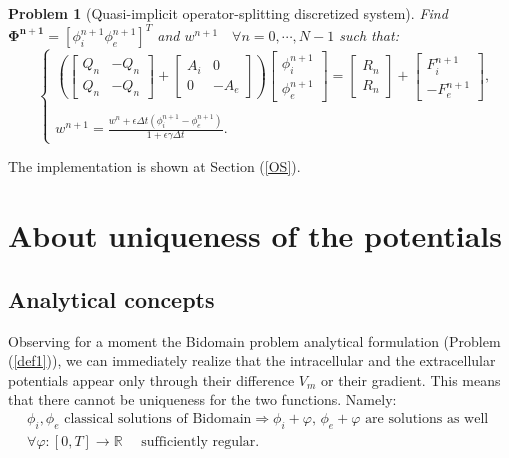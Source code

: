 \documentclass[a4paper,11pt]{article}
\newtheorem{problem}{Problem}
\begin{document}
\begin{problem} [Quasi-implicit operator-splitting discretized system]
Find $\bm{\Phi^{n+1}}=[\phi_i^{n+1} \phi_e^{n+1}]^T$ and $w^{n+1} \quad \forall n=0, \cdots, N-1$ such that:
\begin{equation*}
\quad
\begin{cases}
\left(
\begin{bmatrix} Q_n & -Q_n \\ Q_n & -Q_n \end{bmatrix} + 
\begin{bmatrix} A_i & 0 \\ 0 & -A_e\end{bmatrix}
\right)
\begin{bmatrix}
\phi_i^{n+1} \\ \phi_e^{n+1}
\end{bmatrix}
= \begin{bmatrix} R_n \\ R_n \end{bmatrix} + \begin{bmatrix} F_i^{n+1} \\  -F_e^{n+1}\end{bmatrix},\\ \\
w^{n+1} = \frac{\displaystyle w^n + \epsilon \Delta t (\phi_i^{n+1}-\phi_e^{n+1})}{\displaystyle 1+\epsilon \gamma \Delta t}.
\end{cases}
\end{equation*}
\end{problem}
\vspace{4mm}
\noindent The implementation is shown at Section (\ref{OS}).
\newpage
\section{About uniqueness of the potentials}\label{unique}
\subsection{Analytical concepts}
\noindent Observing for a moment the Bidomain problem analytical formulation (Problem (\ref{def1})), we can immediately realize that the intracellular and the extracellular potentials appear only through their difference $V_m$ or their gradient. This means that there cannot be uniqueness for the two functions. Namely: \vspace{2mm}
\begin{equation}\label{phi_uniqueness}
\begin{gathered}
\phi_i,\phi_e \text{ classical solutions of Bidomain} \Rightarrow \phi_i+\varphi,\,\phi_e+\varphi \text{ are solutions as well } \\
 \forall \varphi: [0,T] \rightarrow \mathbb{R} \quad \text{ sufficiently regular}.
\end{gathered}
\end{equation}
\end{document}
